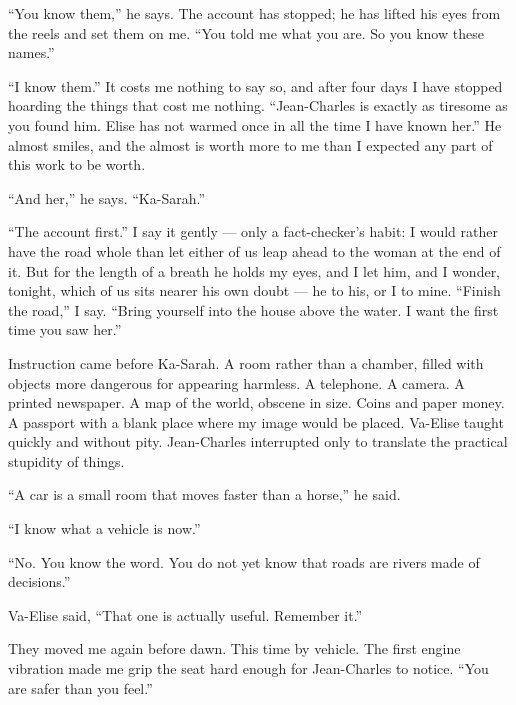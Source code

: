 ``You know them,'' he says. The account has stopped; he has lifted his eyes from the reels and set them on me. ``You told me what you are. So you know these names.''\par

``I know them.'' It costs me nothing to say so, and after four days I have stopped hoarding the things that cost me nothing. ``Jean-Charles is exactly as tiresome as you found him. Elise has not warmed once in all the time I have known her.'' He almost smiles, and the almost is worth more to me than I expected any part of this work to be worth.\par

``And her,'' he says. ``Ka-Sarah.''\par

``The account first.'' I say it gently --- only a fact-checker's habit: I would rather have the road whole than let either of us leap ahead to the woman at the end of it. But for the length of a breath he holds my eyes, and I let him, and I wonder, tonight, which of us sits nearer his own doubt --- he to his, or I to mine. ``Finish the road,'' I say. ``Bring yourself into the house above the water. I want the first time you saw her.''\par

\ornament

Instruction came before Ka-Sarah. A room rather than a chamber, filled with objects more dangerous for appearing harmless. A telephone. A camera. A printed newspaper. A map of the world, obscene in size. Coins and paper money. A passport with a blank place where my image would be placed. Va-Elise taught quickly and without pity. Jean-Charles interrupted only to translate the practical stupidity of things.\par

``A car is a small room that moves faster than a horse,'' he said.\par

``I know what a vehicle is now.''\par

``No. You know the word. You do not yet know that roads are rivers made of decisions.''\par

Va-Elise said, ``That one is actually useful. Remember it.''\par

They moved me again before dawn. This time by vehicle. The first engine vibration made me grip the seat hard enough for Jean-Charles to notice. ``You are safer than you feel.''\par

